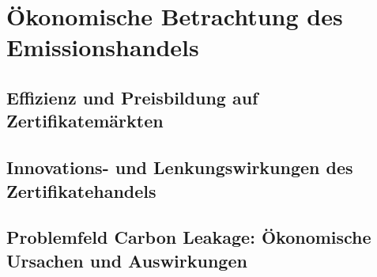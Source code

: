 \chapter{Ökonomische Betrachtung des Emissionshandels}

\section{Effizienz und Preisbildung auf Zertifikatemärkten}

\section{Innovations- und Lenkungswirkungen des Zertifikatehandels}

\section{Problemfeld Carbon Leakage: Ökonomische Ursachen und Auswirkungen}






\nocite{*}